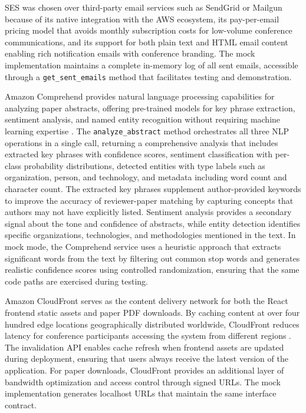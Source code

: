 \documentclass[conference]{IEEEtran}
\begin{document}
SES was chosen over third-party email services such as SendGrid or Mailgun because of its native integration with the AWS ecosystem, its pay-per-email pricing model that avoids monthly subscription costs for low-volume conference communications, and its support for both plain text and HTML email content enabling rich notification emails with conference branding. The mock implementation maintains a complete in-memory log of all sent emails, accessible through a \texttt{get\_sent\_emails} method that facilitates testing and demonstration.

Amazon Comprehend provides natural language processing capabilities for analyzing paper abstracts, offering pre-trained models for key phrase extraction, sentiment analysis, and named entity recognition without requiring machine learning expertise \cite{comprehend2024}. The \texttt{analyze\_abstract} method orchestrates all three NLP operations in a single call, returning a comprehensive analysis that includes extracted key phrases with confidence scores, sentiment classification with per-class probability distributions, detected entities with type labels such as organization, person, and technology, and metadata including word count and character count. The extracted key phrases supplement author-provided keywords to improve the accuracy of reviewer-paper matching by capturing concepts that authors may not have explicitly listed. Sentiment analysis provides a secondary signal about the tone and confidence of abstracts, while entity detection identifies specific organizations, technologies, and methodologies mentioned in the text. In mock mode, the Comprehend service uses a heuristic approach that extracts significant words from the text by filtering out common stop words and generates realistic confidence scores using controlled randomization, ensuring that the same code paths are exercised during testing.

Amazon CloudFront serves as the content delivery network for both the React frontend static assets and paper PDF downloads. By caching content at over four hundred edge locations geographically distributed worldwide, CloudFront reduces latency for conference participants accessing the system from different regions \cite{aws2024}. The invalidation API enables cache refresh when frontend assets are updated during deployment, ensuring that users always receive the latest version of the application. For paper downloads, CloudFront provides an additional layer of bandwidth optimization and access control through signed URLs. The mock implementation generates localhost URLs that maintain the same interface contract.
\end{document}

